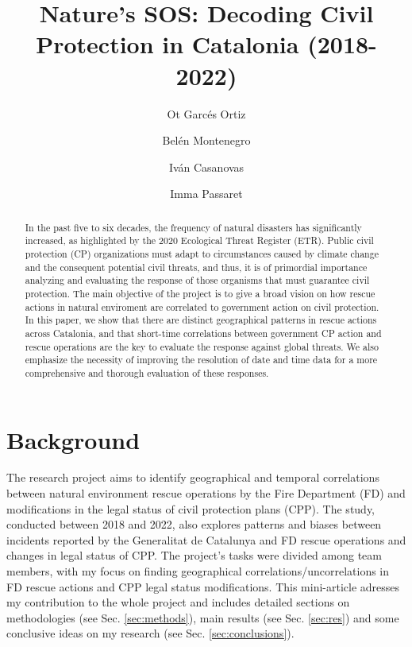 \documentclass[
  journal=small,
  manuscript=mini-article,  %
  year=2023,
  volume=1,
]{odj-journal}
\title{Nature's SOS: Decoding Civil Protection in Catalonia (2018-2022)}
\author{Ot Garcés Ortiz}
\affiliation{MSc Physics of Complex Systems and Biophysics}
\author{Belén Montenegro}
\affiliation{MSc Physics of Complex Systems and Biophysics}
\author{Iván Casanovas}
\affiliation{MSc Physics of Complex Systems and Biophysics}
\author{Imma Passaret}
\affiliation{MSc Physics of Complex Systems and Biophysics}
\begin{document}
\vspace{-0.5cm}
\begin{abstract}
In the past five to six decades, the frequency of natural disasters has significantly increased, as highlighted by the 2020 Ecological Threat Register (ETR). Public civil protection (CP) organizations must adapt to circumstances caused by climate change and the consequent potential civil threats, and thus, it is of primordial importance analyzing and evaluating the response of those organisms that must guarantee civil protection. The main objective of the project is to give a broad vision on how rescue actions in natural enviroment are correlated to government action on civil protection. In this paper, we show that there are distinct geographical patterns in rescue actions across Catalonia, and that short-time correlations between government CP action and rescue operations are the key to evaluate the response against global threats. We also emphasize the necessity of improving the resolution of date and time data for a more comprehensive and thorough evaluation of these responses.
\end{abstract}
\vspace{-1cm}
\section{Background}
The research project aims to identify geographical and temporal correlations between natural environment rescue operations by the Fire Department (FD) and modifications in the legal status of civil protection plans (CPP). The study, conducted between 2018 and 2022, also explores patterns and biases between incidents reported by the Generalitat de Catalunya and FD rescue operations and changes in legal status of CPP. The project's tasks were divided among team members, with my focus on finding geographical correlations/uncorrelations in FD rescue actions and CPP legal status modifications. This mini-article adresses my contribution to the whole project and includes detailed sections on methodologies (see Sec. \ref{sec:methods}), main results (see Sec. \ref{sec:res}) and some conclusive ideas on my research (see Sec. \ref{sec:conclusions}). \\
\end{document}
